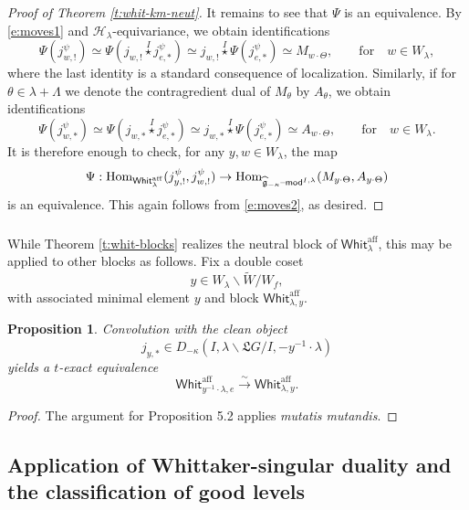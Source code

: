 \documentclass[11pt,reqno]{amsart}
\newcommand{\sH}{\mathscr{H}}
\newcommand{\aff}{\operatorname{aff}}
\newcommand{\Hom}{\operatorname{Hom}}
\newcommand{\fL}{\mathfrak{L}}
\newcommand{\fg}{\mathfrak{g}}
\newtheorem{pro}[subsubsection]{Proposition}
\theoremstyle{remark}
\numberwithin{equation}{section}
\newcommand{\gmk}{\widehat{\fg}_{-\kappa}}
\renewcommand{\mod}{\text{\textendash}\mathsf{mod}}
\newcommand{\Whit}{\mathsf{Whit}}
\begin{document}
\begin{proof}[Proof of Theorem \ref{t:whit-km-neut}]
It remains to see that $\Psi$ is an equivalence. 
By \eqref{e:moves1} and $\sH_\lambda$-equivariance, we obtain identifications
%
\[
\Psi( j_{w, !}^\psi) \simeq \Psi(j_{w, !} \overset{I}{\star} j_{e, *}^\psi ) 
\simeq 
j_{w, !} \overset{I}{\star} \Psi(j_{e, *}^\psi) \simeq M_{w \cdot \Theta}, 
\quad \quad  \text{for} \quad w \in W_\lambda, 
\]
%
where the last identity is a standard consequence of localization. Similarly, 
if for $\theta \in \lambda + \Lambda$ we denote the contragredient 
dual of $M_\theta$ by $A_\theta$, we obtain identifications 
%
\[ \Psi(j_{w, *}^\psi) \simeq \Psi(j_{w, *} \overset{I}{\star} j_{e, *}^\psi) 
\simeq j_{w, *} \overset{I}{\star} \Psi( j_{e, *}^\psi) \simeq A_{w \cdot 
\Theta}, \quad \quad \text{for} \quad w \in W_\lambda.
\] 
%
It is therefore enough to check, for any $y, w \in W_\lambda$, the map
%
\[
\Psi: \Hom_{\Whit_{\lambda}^{\aff}}( j_{y, !}^\psi, j_{w, !}^\psi) \rightarrow 
\Hom_{\gmk\mod^{I, \lambda}}( M_{y \cdot \Theta}, A_{y \cdot \Theta})
\]
%
is an equivalence. This again follows from \eqref{e:moves2}, as desired.  
\end{proof}

\subsubsection{} While Theorem \ref{t:whit-blocks} realizes the neutral block 
of $\Whit_{\lambda}^{\aff}$, this may be applied to other blocks as follows. 
Fix a double coset \[y \in W_\lambda \backslash \widetilde{W} / W_f,\] with 
associated minimal element $y$ and block $\Whit_{\lambda, y}^{\aff}$. 


\begin{pro} \label{p:neutr}Convolution with the clean object
	\[ j_{y, *} \in D_{-\kappa}(I, \lambda \backslash \fL G / I, 
	- y^{-1} \cdot \lambda)
	\]
yields a $t$-exact equivalence
%
\[ \Whit_{y^{-1} \cdot \lambda, e}^{\aff} \xrightarrow{\sim} \Whit_{\lambda, 
y}^{\aff}.
\]
%
\end{pro}

\begin{proof}
The argument for \cite{ly} Proposition 5.2 applies
\emph{mutatis mutandis}.
\end{proof}



\subsection{Application of Whittaker-singular duality and the classification of 
good levels}
\end{document}
